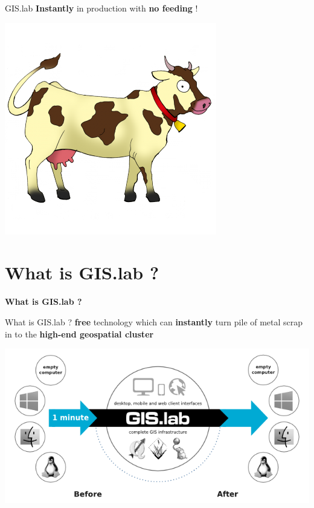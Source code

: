 \documentclass[12pt]{beamer}
\begin{document}
\begin{frame}{GIS.lab}
	\textbf{Instantly} in production with \textbf{no feeding} !
	\begin{center}
		\includegraphics[keepaspectratio=true,height=0.6\textheight]{images/cow.png}
	\end{center}
\end{frame}


\section{What is GIS.lab ?}
\begin{frame}
	\begin{center}
		\LARGE\textbf{What is GIS.lab ?}
	\end{center}
\end{frame}

\begin{frame}{What is GIS.lab ?}
	\textbf{free} technology which can \textbf{instantly} turn pile of metal scrap in to the \textbf{high-end geospatial cluster}
	\begin{center}
		\includegraphics[keepaspectratio=true,height=0.5\textheight]{images/gislab-schema.png}
	\end{center}
\end{frame}
\end{document}

